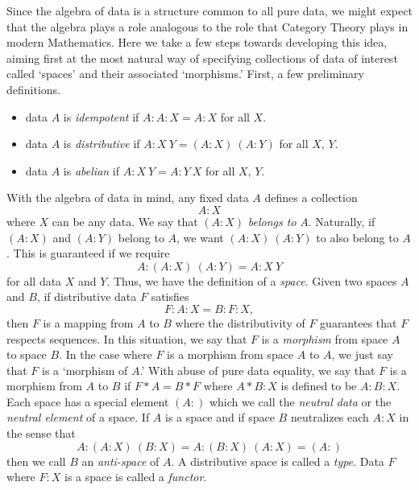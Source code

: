\documentclass[11pt]{article}
\begin{document}
     Since the algebra of data is a structure common to all pure data, we might expect that the algebra plays a role analogous to the 
role that Category Theory plays in modern Mathematics\cite{Mazur}.
 Here we take a few steps towards developing this idea, aiming first at the most natural
 way of specifying collections of data of interest called `spaces' and their associated `morphisms.'  First, a few
 preliminary definitions.
 \begin{itemize}
 \item data $A$ is {\it idempotent} if $A:A:X=A:X$ for all $X$.
 \item data $A$ is {\it distributive} if $A:X\ Y=(A:X)\ (A:Y)$ for all $X$, $Y$.
 \item data $A$ is {\it abelian} if $A:X\ Y=A:Y\ X$ for all $X$, $Y$.
 \end{itemize}
 With the algebra of data in mind, any fixed data $A$ defines a collection
\begin{equation}\label{eqn}
A:X
\end{equation}
where $X$ can be any data.  We say that $(A:X)$ {\it belongs to} $A$.  Naturally,
if $(A:X)$ and $(A:Y)$ belong to $A$, we want $(A:X)\ (A:Y)$ to also belong to $A$.  This is guaranteed if
we require
\begin{equation}\label{eqn}
A : (A : X)\ ( A: Y) = A : X\ Y
\end{equation}
for all data $X$ and $Y$.  Thus, we have the definition of a {\it space}.  Given two spaces $A$ and $B$, if
distributive data $F$ satisfies
\begin{equation}\label{eqn}
F : A : X = B : F : X,
\end{equation}
then $F$ is a mapping from $A$ to $B$ where the distributivity of $F$ guarantees that $F$ respects sequences.
In this situation, we say that $F$ is a {\it morphism} from space $A$ to space $B$.  In the case where $F$
is a morphism from space $A$ to $A$, we just say that $F$ is a `morphism of $A$.'  With abuse of pure data
equality, we say that $F$ is a morphism from $A$ to $B$ if $F*A=B*F$ where $A*B:X$ is defined to be $A:B:X$.
Each space has a special element $(A:)$ which we call the {\it neutral data} or the {\it neutral element} of a space.
If $A$ is a space and if space $B$ neutralizes each $A:X$ in the sense that
\begin{equation}\label{eqn}
A : (A:X)\ (B:X) = A : (B:X)\ (A:X) =  (A:)
\end{equation}
then we call $B$ an {\it anti-space} of $A$.  A distributive space is called a {\it type}.  
Data $F$ where $F:X$ is a space is called a {\it functor}.
\end{document}
